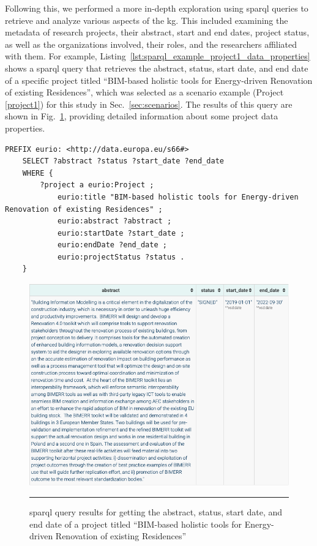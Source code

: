 Following this, we performed a more in-depth exploration using \gls{sparql} queries to retrieve and analyze various aspects of the \gls{kg}.
This included examining the metadata of research projects, their abstract, start and end dates, project status, as well as the organizations involved, their roles, and the researchers affiliated with them.
For example, Listing~\ref{lst:sparql_example_project1_data_properties} shows a \gls{sparql} query that retrieves the abstract, status, start date, and end date of a specific project titled ``BIM-based holistic tools for Energy-driven Renovation of existing Residences'', which was selected as a scenario example (Project \ref{project1}) for this study in Sec.~\ref{sec:scenarios}.
The results of this query are shown in Fig.~\ref{fig:sparql_example_project1_data_properties}, providing detailed information about some project data properties.

\begin{lstlisting}[language=SPARQL, caption={\gls{sparql} query for getting the abstract, status, start date, and end date of a project titled ``BIM-based holistic tools for Energy-driven Renovation of existing Residences''}, label=lst:sparql_example_project1_data_properties]
    PREFIX eurio: <http://data.europa.eu/s66#>
    SELECT ?abstract ?status ?start_date ?end_date
    WHERE {
        ?project a eurio:Project ; 
            eurio:title "BIM-based holistic tools for Energy-driven Renovation of existing Residences" ;
            eurio:abstract ?abstract ;
            eurio:startDate ?start_date ;
            eurio:endDate ?end_date ;
            eurio:projectStatus ?status .
    }
\end{lstlisting}

\begin{figure}[htbp]
    \centering
 \includegraphics[width=.8\textwidth]{figures/architecture/sparql_example_project1_data_properties.png}
     \rule{35em}{0.5pt}
    \caption{\gls{sparql} query results for getting the abstract, status, start date, and end date of a project titled ``BIM-based holistic tools for Energy-driven Renovation of existing Residences''}
 \label{fig:sparql_example_project1_data_properties}
\end{figure}

